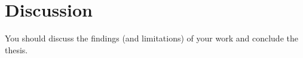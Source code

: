 \section{Discussion}
\label{sec:thesis_discussion}

You should discuss the findings (and limitations) of your work and conclude the thesis.
